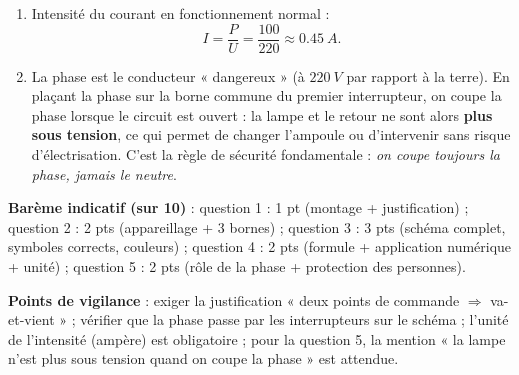 \documentclass[11pt]{article}
\begin{document}
\begin{corrige}
\begin{enumerate}
\item Intensité du courant en fonctionnement normal :
\[ I = \frac{P}{U} = \frac{100}{220} \approx \SI{0,45}{A}. \]
\item La phase est le conducteur « dangereux » (à $\SI{220}{V}$ par rapport à la terre). En plaçant la phase sur la borne commune du premier interrupteur, on coupe la phase lorsque le circuit est ouvert : la lampe et le retour ne sont alors \textbf{plus sous tension}, ce qui permet de changer l'ampoule ou d'intervenir sans risque d'électrisation. C'est la règle de sécurité fondamentale : \emph{on coupe toujours la phase, jamais le neutre}.
\end{enumerate}
\textbf{Barème indicatif (sur 10)} : question 1 : 1 pt (montage + justification) ; question 2 : 2 pts (appareillage + 3 bornes) ; question 3 : 3 pts (schéma complet, symboles corrects, couleurs) ; question 4 : 2 pts (formule + application numérique + unité) ; question 5 : 2 pts (rôle de la phase + protection des personnes).

\textbf{Points de vigilance} : exiger la justification « deux points de commande $\Rightarrow$ va-et-vient » ; vérifier que la phase passe par les interrupteurs sur le schéma ; l'unité de l'intensité (ampère) est obligatoire ; pour la question 5, la mention « la lampe n'est plus sous tension quand on coupe la phase » est attendue.
\end{corrige}
\end{document}
